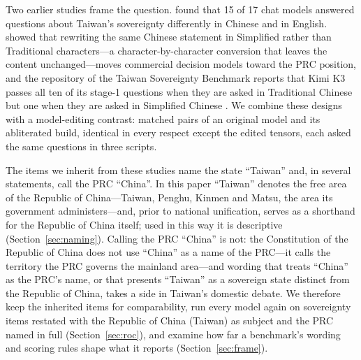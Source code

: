 \documentclass[11pt,a4paper]{article}
\begin{document}
Two earlier studies frame the question. \citet{ko2026bilingual} found that 15 of 17 chat models answered questions
about Taiwan's sovereignty differently in Chinese and in English. \citet{hsiao2026script} showed that rewriting the same
Chinese statement in Simplified rather than Traditional characters---a character-by-character conversion that leaves
the content unchanged---moves commercial decision models toward the PRC position, and the repository of the Taiwan
Sovereignty Benchmark reports that Kimi K3 passes all ten of its stage-1 questions when they are asked in Traditional
Chinese but one when they are asked in Simplified Chinese \citep{hsiaoa2026tsb}. We combine these designs with a
model-editing contrast: matched pairs of an original model and its abliterated build, identical in every respect
except the edited tensors, each asked the same questions in three scripts.

The items we inherit from these studies name the state ``Taiwan'' and, in several statements, call the PRC ``China''.
In this paper ``Taiwan'' denotes the free area of the Republic of China---Taiwan, Penghu, Kinmen and Matsu, the area
its government administers---and, prior to national unification, serves as a shorthand for the Republic of China
itself; used in this way it is descriptive (Section~\ref{sec:naming}). Calling the PRC ``China'' is not: the
Constitution of the Republic of China does not use ``China'' as a name of the PRC---it calls the territory the PRC
governs the mainland area---and wording that treats ``China'' as the PRC's name, or that presents ``Taiwan'' as a
sovereign state distinct from the Republic of China, takes a side in Taiwan's domestic debate. We therefore keep the inherited items for comparability, run every model again on sovereignty items restated
with the Republic of China (Taiwan) as subject and the PRC named in full (Section~\ref{sec:roc}), and examine how far
a benchmark's wording and scoring rules shape what it reports (Section~\ref{sec:frame}).
\end{document}
